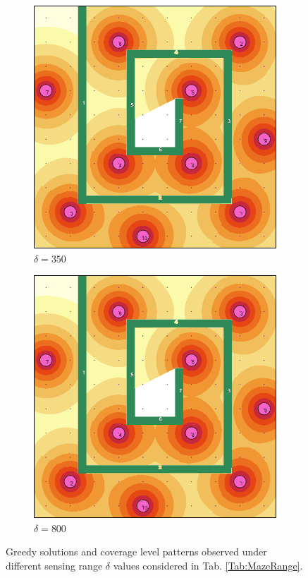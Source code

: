 \documentclass[letterpaper, 10 pt, conference]{ieeeconf}
\begin{document}
\begin{figure}[!h]
\hfill
\begin{subfigure}[t]{0.3\columnwidth}
    \centering
    \includegraphics[width=\columnwidth]{Figures/MazeRange350.png}
    \caption{$\delta = 350$}
\end{subfigure}%
\hfill
\begin{subfigure}[t]{0.3\columnwidth}
    \centering
    \includegraphics[width=\columnwidth]{Figures/MazeRange800.png}
    \caption{$\delta = 800$}
\end{subfigure}%
\caption{Greedy solutions and coverage level patterns observed under different sensing range $\delta$ values considered in Tab. \ref{Tab:MazeRange}.}
\label{Fig:MazeRange}
\end{figure}
\end{document}
